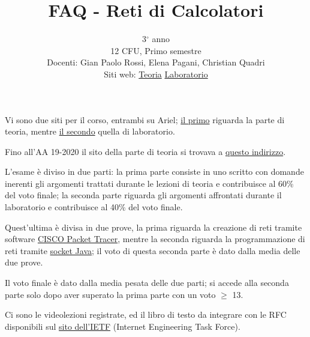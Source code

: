 \documentclass{article}
\title{FAQ - \textbf{Reti di Calcolatori}}
\author{
	3$^{\circ}$ anno\\12 CFU, Primo semestre\\
	Docenti: Gian Paolo Rossi, Elena Pagani, Christian Quadri\\ 
	Siti web:
	\href{https://grossircc.ariel.ctu.unimi.it/v5/frm3/ThreadList.aspx?name=contenuti}{Teoria}
	\href{https://epaganircl.ariel.ctu.unimi.it/v5/frm3/ThreadList.aspx?name=contenuti}{Laboratorio}
	\date{}
}
\begin{document}
 
	\maketitle
	
	\begin{QuestionList}
		
		 {
		    Vi sono due siti per il corso, entrambi su Ariel; \href{https://grossircc.ariel.ctu.unimi.it/v5/frm3/ThreadList.aspx?name=contenuti}{il primo} riguarda la parte di teoria, mentre \href{https://epaganircl.ariel.ctu.unimi.it/v5/frm3/ThreadList.aspx?name=contenuti}{il secondo} quella di laboratorio. 
		
		    Fino all'AA 19-2020 il sito della parte di teoria si trovava a \href{http://old.nptlab.di.unimi.it/index.php/reti-di-calcolatori.html}{questo indirizzo}. 
	    }
		
		 {
		    L'esame è diviso in due parti: la prima parte consiste in uno scritto con domande inerenti gli argomenti trattati durante le lezioni di teoria e contribuisce al 60\% del voto finale; la seconda parte riguarda gli argomenti affrontati durante il laboratorio e contribuisce al 40\% del voto finale.
		
		    Quest'ultima è divisa in due prove, la prima riguarda la creazione di reti tramite software \href{https://en.wikipedia.org/wiki/Packet_Tracer}{CISCO Packet Tracer}, mentre la seconda riguarda la programmazione di reti tramite \href{https://docs.oracle.com/javase/8/docs/api/index.html?java/net/Socket.html}{socket Java}; il voto di questa seconda parte è dato dalla media delle due prove.
		
		    Il voto finale è dato dalla media pesata delle due parti; si accede alla seconda parte solo dopo aver superato la prima parte con un voto $\geq$ 13. 
		}
		
		 {
		    Ci sono le videolezioni registrate, ed il libro di testo da integrare con le RFC disponibili sul \href{https://ietf.org/standards/rfcs/}{sito dell'IETF} (Internet Engineering Task Force).
		}
		
	\end{QuestionList}
	
\end{document}
